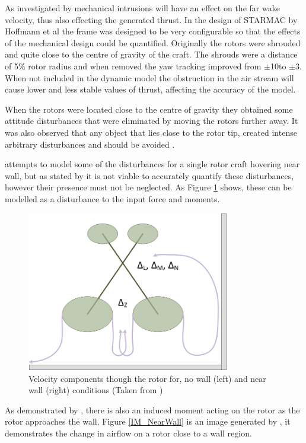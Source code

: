 		As investigated by \cite{Hoffmann} mechanical intrusions will have an effect on the far wake velocity, thus also effecting the generated thrust. In the design of STARMAC by Hoffmann et al \cite{Hoffmann} the frame was designed to be very configurable so that the effects of the mechanical design could be quantified. Originally the rotors were shrouded and quite close to the centre of gravity of the craft. The shrouds were a distance of 5\% rotor radius and when removed the yaw tracking improved from $\pm$10\textdegree to $\pm$3\textdegree. When not included in the dynamic model the obstruction in the air stream will cause lower and less stable values of thrust, affecting the accuracy of the model. 
		
		When the rotors were located close to the centre of gravity they obtained some attitude disturbances that were eliminated by moving the rotors further away. It was also observed that any object that lies close to the rotor tip, created intense arbitrary disturbances and should be avoided \cite{Hoffmann}.
		
		\cite{NearWall} attempts to model some of the disturbances for a single rotor craft hovering near wall, but as stated by \cite{Lee2012} it is not viable to accurately quantify these disturbances, however their presence must not be neglected. As Figure \ref{IM_NearWallF} shows, these can be modelled as a disturbance to the input force and moments.
		
		\begin{figure}[H]
			\centering
			\includegraphics[height = 7cm]{Images/Literature/near_wall}     
			\caption{Velocity components though the rotor for, no wall (left) and near wall (right) conditions (Taken from \cite{NearWall})}
			\label{IM_NearWallF}
		\end{figure}
		
		As demonstrated by \cite{NearWall}, there is also an induced moment acting on the rotor as the rotor approaches the wall. Figure \ref{IM_NearWall} is an image generated by \cite{NearWall}, it demonstrates the change in airflow on a rotor close to a wall region.
		
